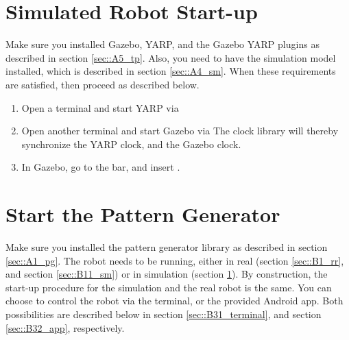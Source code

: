\section{Simulated Robot Start-up}
\label{sec::B2_ss}
Make sure you installed Gazebo, YARP, and the Gazebo YARP plugins as described in section \ref{sec::A5_tp}. Also, you need to have the simulation model installed, which is described in section \ref{sec::A4_sm}. When these requirements are satisfied, then proceed as described below.
\begin{enumerate}
	\item Open a terminal and start YARP via \newline {} \newline
	\item Open another terminal and start Gazebo via \newline {}\newline The clock library will thereby synchronize the YARP clock, and the Gazebo clock.
	\item  In Gazebo, go to the  bar, and insert .
\end{enumerate}
\FloatBarrier
\section{Start the Pattern Generator}
\label{sec::B3_sp}
Make sure you installed the pattern generator library as described in section \ref{sec::A1_pg}. The robot needs to be running, either in real (section \ref{sec::B1_rr}, and section \ref{sec::B11_sm}) or in simulation (section \ref{sec::B2_ss}). By construction, the start-up procedure for the simulation and the real robot is the same. You can choose to control the robot via the terminal, or the provided Android app. Both possibilities are described below in section \ref{sec::B31_terminal}, and section \ref{sec::B32_app}, respectively.
\FloatBarrier
